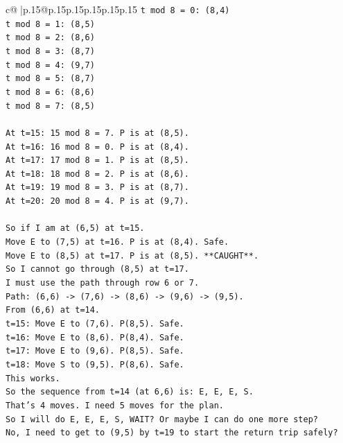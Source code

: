 \documentclass{article}
\begin{document}
{\begin{supertabular}{c@{$\;$}|p{.15\linewidth}@{}p{.15\linewidth}p{.15\linewidth}p{.15\linewidth}p{.15\linewidth}p{.15\linewidth}}
{{{\texttt{t mod 8 = 0: (8,4)} \\
\texttt{t mod 8 = 1: (8,5)} \\
\texttt{t mod 8 = 2: (8,6)} \\
\texttt{t mod 8 = 3: (8,7)} \\
\texttt{t mod 8 = 4: (9,7)} \\
\texttt{t mod 8 = 5: (8,7)} \\
\texttt{t mod 8 = 6: (8,6)} \\
\texttt{t mod 8 = 7: (8,5)} \\
\\ 
\texttt{At t=15: 15 mod 8 = 7. P is at (8,5).} \\
\texttt{At t=16: 16 mod 8 = 0. P is at (8,4).} \\
\texttt{At t=17: 17 mod 8 = 1. P is at (8,5).} \\
\texttt{At t=18: 18 mod 8 = 2. P is at (8,6).} \\
\texttt{At t=19: 19 mod 8 = 3. P is at (8,7).} \\
\texttt{At t=20: 20 mod 8 = 4. P is at (9,7).} \\
\\ 
\texttt{So if I am at (6,5) at t=15.} \\
\texttt{Move E to (7,5) at t=16. P is at (8,4). Safe.} \\
\texttt{Move E to (8,5) at t=17. P is at (8,5). **CAUGHT**.} \\
\texttt{So I cannot go through (8,5) at t=17.} \\
\texttt{I must use the path through row 6 or 7.} \\
\texttt{Path: (6,6) {-}> (7,6) {-}> (8,6) {-}> (9,6) {-}> (9,5).} \\
\texttt{From (6,6) at t=14.} \\
\texttt{t=15: Move E to (7,6). P(8,5). Safe.} \\
\texttt{t=16: Move E to (8,6). P(8,4). Safe.} \\
\texttt{t=17: Move E to (9,6). P(8,5). Safe.} \\
\texttt{t=18: Move S to (9,5). P(8,6). Safe.} \\
\texttt{This works.} \\
\texttt{So the sequence from t=14 (at 6,6) is: E, E, E, S.} \\
\texttt{That's 4 moves. I need 5 moves for the plan.} \\
\texttt{So I will do E, E, E, S, WAIT? Or maybe I can do one more step?} \\
\texttt{No, I need to get to (9,5) by t=19 to start the return trip safely?} \\
}}}
\end{supertabular}}
\end{document}
